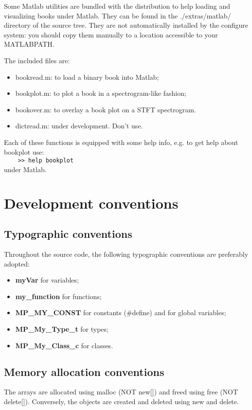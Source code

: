 \documentclass[11pt,a4paper]{article}
\begin{document}
Some Matlab utilities are bundled with the distribution to help loading and
visualizing books under Matlab. They can be found in the ./extras/matlab/
directory of the source tree. They are not automatically installed by the
configure system: you should copy them manually to a location accessible to
your MATLABPATH.

\bigskip

\noindent The included files are:
\begin{itemize}
\item bookread.m: to load a binary book into Matlab;
\item bookplot.m: to plot a book in a spectrogram-like fashion;
\item bookover.m: to overlay a book plot on a STFT spectrogram.
\item dictread.m: under development. Don't use.
\end{itemize}
Each of these functions is equipped with some help info, e.g. to get help about
bookplot use:\\
\verb+    >> help bookplot+ \\
under Matlab.


\appendix

\clearpage
\section{Development conventions}

\subsection{Typographic conventions}
Throughout the source code, the following typographic conventions are
preferably adopted:
\begin{itemize}
\item {\bf myVar} for variables;
\item {\bf my\_function} for functions;
\item {\bf MP\_MY\_CONST} for constants (\#define) and for global variables;
\item {\bf MP\_My\_Type\_t} for types;
\item {\bf MP\_My\_Class\_c} for classes.
\end{itemize}

\subsection{Memory allocation conventions}
The arrays are allocated using malloc (NOT new[]) and freed using free (NOT
delete[]). Conversely, the objects are created and deleted using new and
delete.
\end{document}
